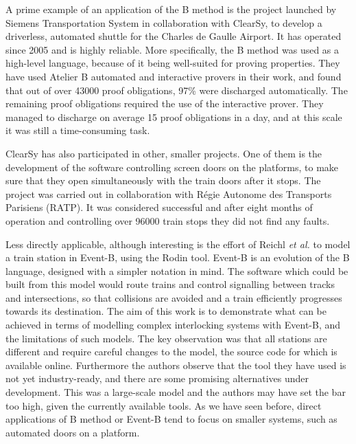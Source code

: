 \documentclass[12pt,journal,duplex]{IEEEtran}
\begin{document}
	A prime example of an application of the B method is the project launched by Siemens Transportation System in collaboration with ClearSy, to develop a driverless, automated shuttle for the Charles de Gaulle Airport\cite{airport shuttle}. It has operated since 2005 and is highly reliable. More specifically,  the B method was used as a high-level language, because of it being well-suited for proving properties. They have used Atelier B automated and interactive provers in their work, and found that out of over 43000 proof obligations, 97\% were discharged automatically. The remaining proof obligations required the use of the interactive prover. They managed to discharge on average 15 proof obligations in a day, and at this scale it was still a time-consuming task.

	ClearSy has also participated in other, smaller projects. One of them is the development of the software controlling screen doors on the platforms, to make sure that they open simultaneously with the train doors after it stops. The project was carried out in collaboration with R\'{e}gie Autonome des Transports Parisiens (RATP). It was considered successful and after eight months of operation and controlling over 96000 train stops they did not find any faults\cite{screen doors}.

	Less directly applicable, although interesting is the effort of Reichl \textit{et al.} to model a train station in Event-B, using the Rodin tool\cite{station model}. Event-B is an evolution of the B language, designed with a simpler notation in mind.\cite{event-b} The software which could be built from this model would route trains and control signalling between tracks and intersections, so that collisions are avoided and a train efficiently progresses towards its destination. The aim of this work is to demonstrate what can be achieved in terms of modelling complex interlocking systems with Event-B, and the limitations of such models. The key observation was that all stations are different and require careful changes to the model, the source code for which is available online. Furthermore the authors observe that the tool they have used is not yet industry-ready, and there are some promising alternatives under development. This was a large-scale model and the authors may have set the bar too high, given the currently available tools. As we have seen before, direct applications of B method or Event-B tend to focus on smaller systems, such as automated doors on a platform.
\end{document}
